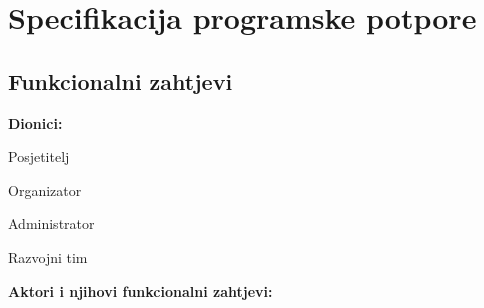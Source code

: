 \chapter{Specifikacija programske potpore}
		
			
		
	\section{Funkcionalni zahtjevi}
			
			
			
				
			
			
			\noindent \textbf{Dionici:}
			
			\begin{packed_enum}
				
				\item Posjetitelj
				\item Organizator			
				\item Administrator
				\item Razvojni tim
				
			\end{packed_enum}
			
			\noindent \textbf{Aktori i njihovi funkcionalni zahtjevi:}
			
